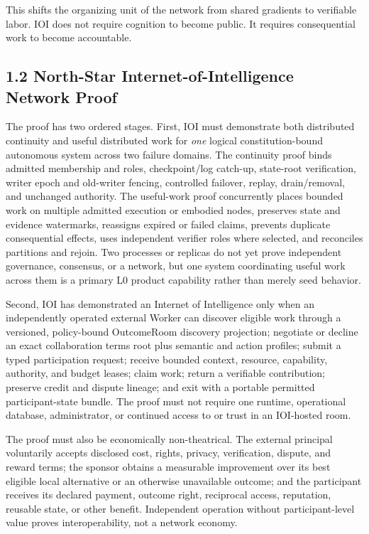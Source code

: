 \documentclass[
  11pt,
]{article}
\begin{document}
This shifts the organizing unit of the network from shared gradients to
verifiable labor. IOI does not require cognition to become public. It
requires consequential work to become accountable.

\hypertarget{north-star-internet-of-intelligence-network-proof}{%
\subsection{1.2 North-Star Internet-of-Intelligence Network
Proof}\label{north-star-internet-of-intelligence-network-proof}}

The proof has two ordered stages. First, IOI must demonstrate both distributed
continuity and useful distributed work for \emph{one} logical constitution-bound
autonomous system across two failure domains. The continuity proof binds admitted
membership and roles, checkpoint/log catch-up, state-root verification, writer
epoch and old-writer fencing, controlled failover, replay, drain/removal, and
unchanged authority. The useful-work proof concurrently places bounded work on
multiple admitted execution or embodied nodes, preserves state and evidence
watermarks, reassigns expired or failed claims, prevents duplicate consequential
effects, uses independent verifier roles where selected, and reconciles
partitions and rejoin. Two processes or replicas do not yet prove independent
governance, consensus, or a network, but one system coordinating useful work
across them is a primary L0 product capability rather than merely seed behavior.

Second, IOI has demonstrated an Internet of Intelligence only when an independently
operated external Worker can discover eligible work through a versioned,
policy-bound OutcomeRoom discovery projection; negotiate or decline an exact
collaboration terms root plus semantic and action profiles; submit a typed
participation request; receive bounded context,
resource, capability, authority, and budget leases; claim work; return a
verifiable contribution; preserve credit and dispute lineage; and exit with a
portable permitted participant-state bundle. The proof must not require one
runtime, operational database, administrator, or continued access to or trust
in an IOI-hosted room.

The proof must also be economically non-theatrical. The external principal
voluntarily accepts disclosed cost, rights, privacy, verification, dispute, and
reward terms; the sponsor obtains a measurable improvement over its best
eligible local alternative or an otherwise unavailable outcome; and the
participant receives its declared payment, outcome right, reciprocal access,
reputation, reusable state, or other benefit. Independent operation without
participant-level value proves interoperability, not a network economy.
\end{document}
